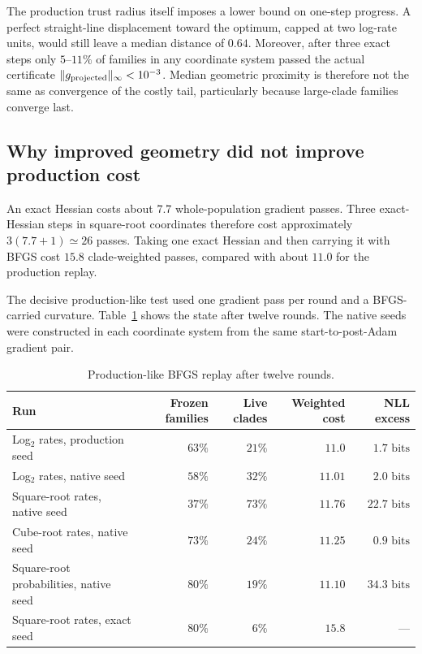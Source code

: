 \documentclass[11pt]{article}
\newcommand{\bits}{\text{ bits}}
\begin{document}
The production trust radius itself imposes a lower bound on one-step progress.  A perfect
straight-line displacement toward the optimum, capped at two log-rate units, would still leave a
median distance of $0.64$.  Moreover, after three exact steps only $5$--$11\%$ of families in any
coordinate system passed the actual certificate
$\lVert g_{\rm projected}\rVert_\infty<10^{-3}$.  Median geometric proximity is therefore not the
same as convergence of the costly tail, particularly because large-clade families converge last.

\subsection{Why improved geometry did not improve production cost}

An exact Hessian costs about $7.7$ whole-population gradient passes.  Three exact-Hessian steps in
square-root coordinates therefore cost approximately
$3(7.7+1)\simeq26$ passes.  Taking one exact Hessian and then carrying it with BFGS cost $15.8$
clade-weighted passes, compared with about $11.0$ for the production replay.

The decisive production-like test used one gradient pass per round and a BFGS-carried curvature.
Table~\ref{tab:bfgs} shows the state after twelve rounds.  The native seeds were constructed in
each coordinate system from the same start-to-post-Adam gradient pair.

\begin{table}[htbp]
\centering
\small
\caption{Production-like BFGS replay after twelve rounds.}
\label{tab:bfgs}
\begin{tabular}{lrrrr}
\toprule
Run & Frozen families & Live clades & Weighted cost & NLL excess \\
\midrule
Log$_2$ rates, production seed & $63\%$ & $21\%$ & $11.0$ & $1.7\bits$ \\
Log$_2$ rates, native seed     & $58\%$ & $32\%$ & $11.01$ & $2.0\bits$ \\
Square-root rates, native seed & $37\%$ & $73\%$ & $11.76$ & $22.7\bits$ \\
Cube-root rates, native seed   & $73\%$ & $24\%$ & $11.25$ & $0.9\bits$ \\
Square-root probabilities, native seed & $80\%$ & $19\%$ & $11.10$ & $34.3\bits$ \\
Square-root rates, exact seed & $80\%$ & $6\%$ & $15.8$ & --- \\
\bottomrule
\end{tabular}
\end{table}
\end{document}
